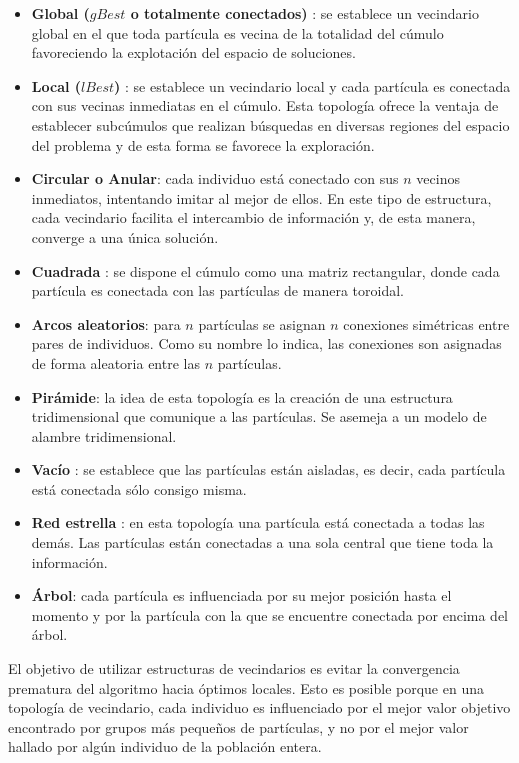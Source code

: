   \begin{itemize}
   \item \textbf{Global ($gBest$ o totalmente conectados)} \cite{JKRBParticle}: se establece un vecindario global en el que toda part\'icula 
   es vecina de la totalidad del c\'umulo favoreciendo la explotaci\'on del espacio de soluciones.
   \item \textbf{Local ($lBest$)} \cite{JKRBParticle}: se establece un vecindario local y cada part\'icula es conectada con sus vecinas inmediatas 
   en el c\'umulo. Esta topolog\'ia ofrece la ventaja de establecer subc\'umulos que realizan b\'usquedas en diversas regiones del espacio 
   del problema y de esta forma se favorece la exploraci\'on.
   \item \textbf{Circular o Anular}: cada individuo est\'a conectado con sus $n$ vecinos inmediatos, intentando imitar al mejor de ellos. En este 
   tipo de estructura, cada vecindario facilita el intercambio de informaci\'on y, de esta manera, converge a una \'unica soluci\'on.
   \item \textbf{Cuadrada} \cite{JKRBPaM}: se dispone el c\'umulo como una matriz rectangular, donde cada part\'icula es conectada 
   con las part\'iculas de manera toroidal.
   \item \textbf{Arcos aleatorios}: para $n$ part\'iculas se asignan $n$ conexiones sim\'etricas entre pares de individuos. Como su nombre 
   lo indica, las conexiones son asignadas de forma aleatoria entre las $n$ part\'iculas.
   \item \textbf{Pir\'amide}: la idea de esta topolog\'ia es la creaci\'on de una estructura tridimensional que comunique a las part\'iculas. 
   Se asemeja a un modelo de alambre tridimensional.
   \item \textbf{Vac\'io} \cite{Margarita01}: se establece que las part\'iculas est\'an aisladas, es decir, cada part\'icula est\'a conectada 
    s\'olo consigo misma.
   \item \textbf{Red estrella} \cite{Margarita01}: en esta topolog\'ia una part\'icula est\'a conectada a todas las dem\'as. Las part\'iculas est\'an conectadas 
   a una sola central que tiene toda la informaci\'on. 
   \item \textbf{\'Arbol}: cada part\'icula es influenciada por su mejor posici\'on hasta el momento y por la part\'icula con la que 
   se encuentre conectada por encima del \'arbol.
  \end{itemize}

  El objetivo de utilizar estructuras de vecindarios es evitar la convergencia prematura del algoritmo hacia \'optimos locales. Esto es posible 
  porque en una topolog\'ia de vecindario, cada individuo es influenciado por el mejor valor objetivo encontrado por grupos m\'as peque\~nos de 
  part\'iculas, y no por el mejor valor hallado por alg\'un individuo de la poblaci\'on entera.
   
